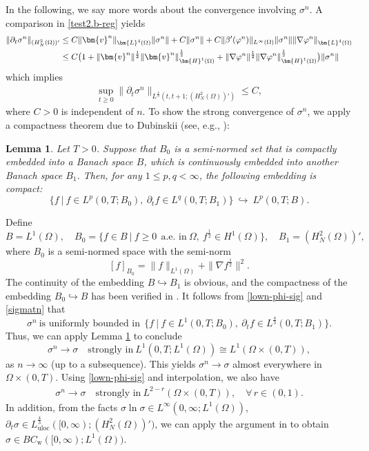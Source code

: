 \documentclass[11pt,reqno]{amsart}
\newtheorem{lemma}{\textbf{Lemma}}[section]
\begin{document}
In the following, we say more words about the convergence involving $\sigma^n$. A comparison in \eqref{test2.b-reg} yields
\begin{align}
 \|\partial_{t}\sigma^{n}\|_{(H^2_N(\Omega))'}
& \leq C \|\bm{v}^n\|_{\bm{L}^4(\Omega)} \|\sigma^n\|+ C\|\sigma^n\|
+ C\|\beta'(\varphi^n)\|_{L^\infty(\Omega)} \| \sigma^n\| \| \nabla \varphi^n\|_{\bm{L}^4(\Omega)}
\notag \\
& \leq C \big(1+ \|\bm{v}^n\|^\frac12 \|\bm{v}^n\|_{\bm{H}^1(\Omega)}^\frac12+ \|\nabla \varphi^n\|^\frac12 \|\nabla \varphi^n\|_{\bm{H}^1(\Omega)}^\frac12 \big) \|\sigma^n\|
\notag
\end{align}
%
which implies
%
\begin{align}
 \sup_{t\geq 0}\|\partial_{t}\sigma^{n}\|_{L^\frac{4}{3}(t,t+1;(H^2_N(\Omega))')}\leq C,
 \label{sigmatn}
\end{align}
%
where $C>0$ is independent of $n$. To show the strong convergence of $\sigma^n$, we apply a compactness theorem due to Dubinskii (see, e.g., \cite{Dubin1965,BS2012}):
%
\begin{lemma}\label{Dubin}
Let $T>0$. Suppose that $B_0$ is a semi-normed set
that is compactly embedded into a Banach space $B$, which is continuously embedded into
another Banach space $B_1$. Then, for any $1\leq p, q<\infty$, the following embedding is compact:
$$
\big\{f\ \big|\ f\in L^p(0,T;B_0),\ \partial_t f\in L^q(0,T;B_1)\big\}\ \hookrightarrow \ L^p (0,T; B).
$$
\end{lemma}
Define
$$
B=L^1(\Omega),\quad B_0=\big\{f\in B\ \big|\ f\geq 0 \ \  \text{a.e. in}\ \Omega,\ f^\frac12\in H^1(\Omega)\big\},\quad B_1=(H_N^2(\Omega))',
$$
where $B_0$ is a semi-normed space with the semi-norm
$$
[f]_{B_0}=\|f\|_{L^1(\Omega)}+\|\nabla f^\frac12\|^2.
$$
The continuity of the embedding $B\hookrightarrow B_1$ is obvious, and the compactness of the embedding $B_0\hookrightarrow B$ has been verified in \cite{BLS2017}. It follows from \eqref{lown-phi-sig} and \eqref{sigmatn} that
$$
\sigma^n\ \text{is uniformly bounded in}\  \ \big\{f\ \big|\ f\in L^1(0,T;B_0),\ \partial_t f\in L^\frac{4}{3}(0,T;B_1)\big\}.
$$
Thus, we can apply Lemma \ref{Dubin} to conclude
$$
\sigma^n \to \sigma \quad\text{strongly in}\ L^1(0,T; L^1(\Omega)) \cong L^1(\Omega\times(0,T)),
$$
as $n\to \infty$ (up to a subsequence). This yields
$\sigma^n \to \sigma$ almost everywhere in $\Omega\times(0,T)$. Using \eqref{lown-phi-sig} and interpolation, we also have
\begin{align}
\sigma^n \to \sigma \quad\text{strongly in}\ L^{2-r}(\Omega\times(0,T)),\quad \forall\,r\in (0,1).
\label{conv-sig-Lr}
\end{align}
In addition, from the facts $\sigma\ln \sigma \in  L^\infty(0,\infty; L^1(\Omega))$, $\partial_t \sigma\in L^\frac{4}{3}_{\mathrm{uloc}}([0,\infty);(H^2_N(\Omega))')$, we can apply the argument in \cite[Section 12]{BLS2017} to obtain $\sigma\in BC_\mathrm{w}([0,\infty);L^1(\Omega))$.
\end{document}
